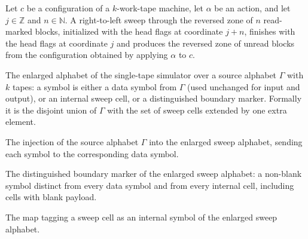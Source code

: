 \begin{lemma}
\label{Turing.FinTM.write_zone}
\leanok
{}
Let $c$ be a configuration of a $k$-work-tape machine, let $\alpha$ be an action, and
let $j\in\mathbb{Z}$ and $n\in\mathbb{N}$. A right-to-left sweep through the reversed
zone of $n$ read-marked blocks, initialized with the head flags at coordinate $j+n$,
finishes with the head flags at coordinate $j$ and produces the reversed zone of unread
blocks from the configuration obtained by applying $\alpha$ to $c$.
\end{lemma}

\begin{definition}
\label{Turing.FinTM.SweepAlphabet}
\leanok
{}
The enlarged alphabet of the single-tape simulator over a source alphabet $\Gamma$ with
$k$ tapes: a symbol is either a data symbol from $\Gamma$ (used unchanged for input and
output), or an internal sweep cell, or a distinguished boundary marker. Formally it is
the disjoint union of $\Gamma$ with the set of sweep cells extended by one extra
element.
\end{definition}

\begin{definition}
\label{Turing.FinTM.sweepEmbed}
\leanok
{}
The injection of the source alphabet $\Gamma$ into the enlarged sweep alphabet, sending
each symbol to the corresponding data symbol.
\end{definition}

\begin{definition}
\label{Turing.FinTM.sweepBoundary}
\leanok
{}
The distinguished boundary marker of the enlarged sweep alphabet: a non-blank symbol
distinct from every data symbol and from every internal cell, including cells with blank
payload.
\end{definition}

\begin{definition}
\label{Turing.FinTM.sweepSymbol}
\leanok
{}
The map tagging a sweep cell as an internal symbol of the enlarged sweep alphabet.
\end{definition}

